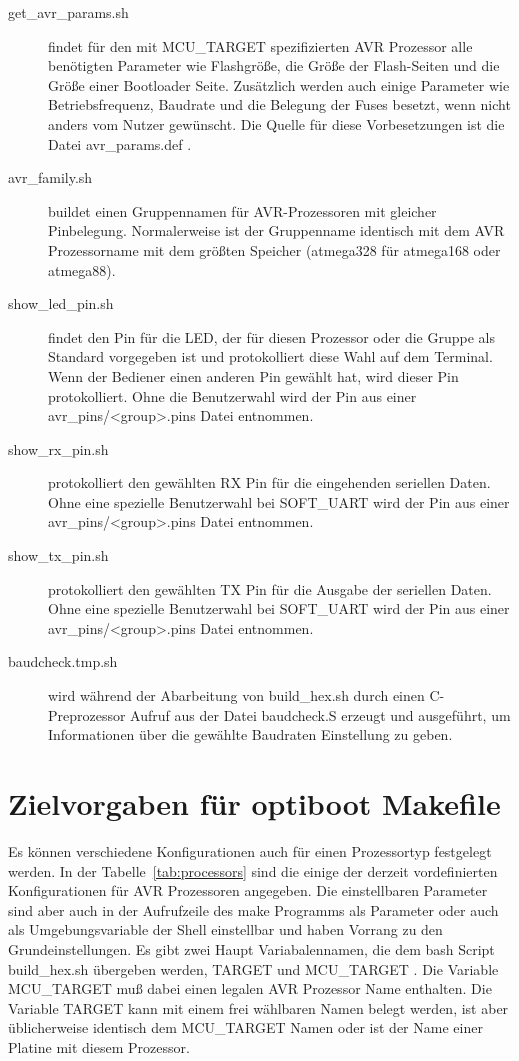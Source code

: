 \begin{description}
\item [get\_avr\_params.sh] findet für den mit MCU\_TARGET spezifizierten AVR Prozessor
alle benötigten Parameter wie Flashgröße, die Größe der Flash-Seiten und die Größe einer
Bootloader Seite. Zusätzlich werden auch einige Parameter wie Betriebsfrequenz,
Baudrate und die Belegung der Fuses besetzt, wenn nicht anders vom Nutzer gewünscht.
Die Quelle für diese Vorbesetzungen ist die Datei avr\_params.def .

\item [avr\_family.sh] buildet einen Gruppennamen für AVR-Prozessoren mit gleicher
Pinbelegung. Normalerweise ist der Gruppenname identisch mit dem AVR Prozessorname
mit dem größten Speicher (atmega328 für atmega168 oder atmega88).

\item [show\_led\_pin.sh] findet den Pin für die LED, der für diesen Prozessor
oder die Gruppe als Standard vorgegeben ist und protokolliert diese Wahl
auf dem Terminal. Wenn der Bediener einen anderen Pin gewählt hat, wird dieser
Pin protokolliert.
Ohne die Benutzerwahl wird der Pin aus einer avr\_pins/<group>.pins Datei entnommen.

\item [show\_rx\_pin.sh] protokolliert den gewählten  RX Pin für die eingehenden seriellen Daten.
Ohne eine spezielle Benutzerwahl bei SOFT\_UART wird der Pin aus einer avr\_pins/<group>.pins Datei entnommen.

\item [show\_tx\_pin.sh] protokolliert den gewählten TX Pin für die Ausgabe der seriellen Daten.
Ohne eine spezielle Benutzerwahl bei SOFT\_UART wird der Pin aus einer avr\_pins/<group>.pins Datei entnommen.

\item [baudcheck.tmp.sh] wird während der Abarbeitung von build\_hex.sh durch einen
C-Preprozessor Aufruf aus der Datei baudcheck.S erzeugt und ausgeführt, um Informationen
über die gewählte Baudraten Einstellung zu geben.

\end{description}

\section{Zielvorgaben für optiboot Makefile}

Es können verschiedene Konfigurationen auch für einen Prozessortyp
festgelegt werden. In der Tabelle~\ref{tab:processors} sind die einige der derzeit vordefinierten
Konfigurationen für AVR Prozessoren angegeben. 
Die einstellbaren Parameter sind aber auch in der Aufrufzeile des
make Programms als Parameter oder auch als Umgebungsvariable der Shell
einstellbar und haben Vorrang zu den Grundeinstellungen.
Es gibt zwei Haupt Variabalennamen, die dem bash Script build\_hex.sh übergeben
werden, TARGET und MCU\_TARGET . Die Variable MCU\_TARGET muß dabei
einen legalen AVR Prozessor Name enthalten. Die Variable TARGET kann mit einem frei wählbaren
Namen belegt werden, ist aber üblicherweise identisch dem MCU\_TARGET Namen oder
ist der Name einer Platine mit diesem Prozessor.

